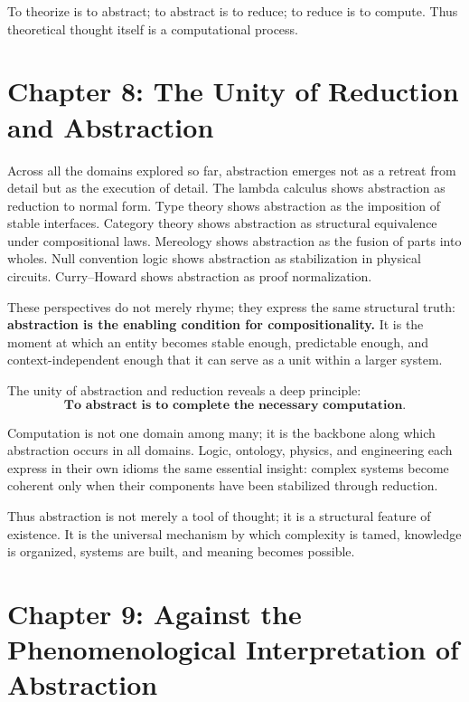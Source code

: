 \documentclass[12pt,letterpaper]{article}
\theoremstyle{remark}
\begin{document}
To theorize is to abstract; to abstract is to reduce; to reduce is to compute. Thus theoretical thought itself is a computational process.

\newpage

\section{Chapter 8: The Unity of Reduction and Abstraction}

Across all the domains explored so far, abstraction emerges not as a retreat from detail but as the execution of detail. The lambda calculus shows abstraction as reduction to normal form. Type theory shows abstraction as the imposition of stable interfaces. Category theory shows abstraction as structural equivalence under compositional laws. Mereology shows abstraction as the fusion of parts into wholes. Null convention logic shows abstraction as stabilization in physical circuits. Curry--Howard shows abstraction as proof normalization.

These perspectives do not merely rhyme; they express the same structural truth: \textbf{abstraction is the enabling condition for compositionality.} It is the moment at which an entity becomes stable enough, predictable enough, and context-independent enough that it can serve as a unit within a larger system.

The unity of abstraction and reduction reveals a deep principle:
\[
\textbf{To abstract is to complete the necessary computation.}
\]

Computation is not one domain among many; it is the backbone along which abstraction occurs in all domains. Logic, ontology, physics, and engineering each express in their own idioms the same essential insight: complex systems become coherent only when their components have been stabilized through reduction.

Thus abstraction is not merely a tool of thought; it is a structural feature of existence. It is the universal mechanism by which complexity is tamed, knowledge is organized, systems are built, and meaning becomes possible.

\newpage

\section{Chapter 9: Against the Phenomenological Interpretation of Abstraction}
\end{document}
